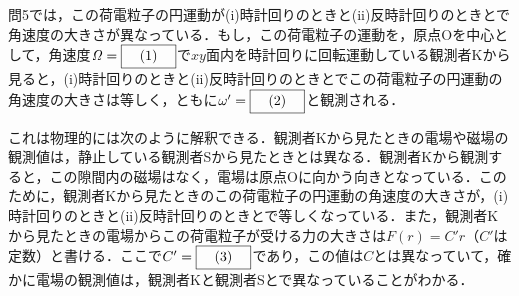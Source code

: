 \begin{enumerate}[label = {〔 \Roman* 〕}]
\begin{enumerate}[label={問\arabic*}, resume]
        問5では，この荷電粒子の円運動が(i)時計回りのときと(ii)反時計回りのときとで角速度の大きさが異なっている．もし，この荷電粒子の運動を，原点Oを中心として，角速度$\mathit{\Omega} = \text{\boxnum{1}}$で$xy$面内を時計回りに回転運動している観測者Kから見ると，(i)時計回りのときと(ii)反時計回りのときとでこの荷電粒子の円運動の角速度の大きさは等しく，ともに$\omega ' = \text{\boxnum{2}}$と観測される．

        これは物理的には次のように解釈できる．観測者Kから見たときの電場や磁場の観測値は，静止している観測者Sから見たときとは異なる．観測者Kから観測すると，この隙間内の磁場はなく，電場は原点Oに向かう向きとなっている．このために，観測者Kから見たときのこの荷電粒子の円運動の角速度の大きさが，(i)時計回りのときと(ii)反時計回りのときとで等しくなっている．また，観測者Kから見たときの電場からこの荷電粒子が受ける力の大きさは$F(r) = C' r$（$C'$は定数）と書ける．ここで$C' = \text{\boxnum{3}}$であり，この値は$C$とは異なっていて，確かに電場の観測値は，観測者Kと観測者Sとで異なっていることがわかる．
    \end{enumerate}
\end{enumerate}

